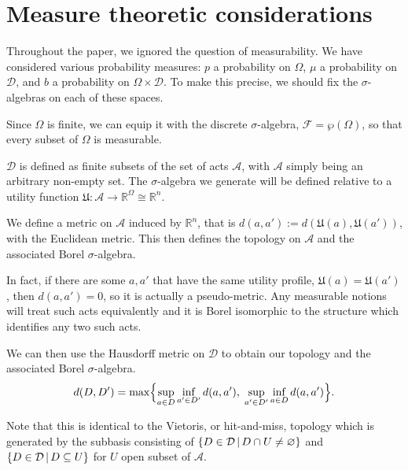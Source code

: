 \documentclass[a4paper]{article}
\newcommand\A{\mathcal{A}}
\newcommand\U{\mathfrak{U}} %
\newcommand{\Decs}{\mathcal{D}}
\renewcommand{\Re}{\mathbb{R}}
\renewcommand{\color}[1]{}
\newenvironment{colored}[1]{\leavevmode\color{#1}}{}
\newcommand\SetDelimiter[1][]{
	\nonscript\,#1\vert \allowbreak \nonscript\,\mathopen{}}
\providecommand\given{\SetDelimiter}
\renewcommand{\emptyset}{\varnothing}
\newenvironment{CCM rewritten}
{\begingroup\color{blue}} %
{\endgroup}              %
\begin{document}
\begin{colored}{violet}
	

	
	\section{Measure theoretic considerations}\label{sect:appendix:measure}
	Throughout the paper, we ignored the question of measurability. We have considered various probability measures: $p$ a probability on $\Omega$, $\mu$ a probability on $\Decs$, and $b$ a probability on $\Omega\times\Decs$. To make this precise, we should fix the $\sigma$-algebras on each of these spaces.
	
	Since $\Omega$ is finite, we can equip it with the discrete $\sigma$-algebra, $\mathcal{F}=\wp(\Omega)$, so that every subset of $\Omega$ is measurable. 	
	
	$\Decs$ is defined as finite subsets of the set of acts $\A$, with $\A$ simply being an arbitrary non-empty set. 
	The $\sigma$-algebra we generate will be defined relative to a utility function $\U:\A\to\Re^\Omega\cong\Re^n$. 
	
	We define a metric on $\A$ induced by $\Re^n$, that is $d(a,a'):=d(\U(a),\U(a'))$, with the Euclidean metric. 
	This then defines the topology on $\A$ and the associated Borel $\sigma$-algebra. 
	
	In fact, if there are some $a,a'$ that have the same utility profile, $\U(a)=\U(a')$, then $d(a,a')=0$, so it is actually a pseudo-metric. Any measurable notions will treat such acts equivalently and it is Borel isomorphic to the structure which identifies any two such acts.
	
	We can then use the Hausdorff metric on $\Decs$ to obtain our topology and the associated Borel $\sigma$-algebra.
	  \[
	d(D, D') = \max\Bigl\{
	\sup_{a \in D}\inf_{a' \in D'}d(a,a'),
	\;\sup_{a' \in D'}\inf_{a \in D}d(a,a')
	\Bigr\}.
	\]
	
	
	\begin{colored}{red}
		Note that this is identical to the Vietoris, or hit-and-miss, topology which is generated by the subbasis consisting of $\{D\in \Decs\given D\cap U\neq \emptyset\}$ and $\{D \in\Decs\given D\subseteq U\}$ for $U$ open subset of $\A$. 
	\end{colored}
	

	


\end{colored}
\end{document}
